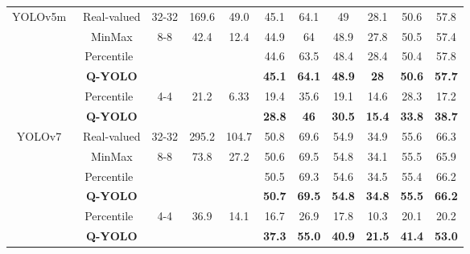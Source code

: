 \documentclass[runningheads]{llncs}
\begin{document}
\begin{table}[!t]
\begin{tabular}{ccccccccccc}
\multirow{6}{*}{YOLOv5m~\cite{yolov5}} & Real-valued & 32-32                & 169.6               & 49.0            & 45.1 & 64.1 & 49   & 28.1 & 50.6 & 57.8 \\ \cline{2-11} 
                         & MinMax      & \multirow{3}{*}{8-8} & \multirow{3}{*}{42.4} & \multirow{3}{*}{12.4}  & 44.9 & 64   & 48.9 & 27.8 & 50.5 & 57.4 \\
                         & Percentile~\cite{li2019fully}  & & &                      & 44.6 & 63.5 & 48.4 & 28.4 & 50.4 & 57.8 \\
                         & \textbf{Q-YOLO} & & & & \textbf{45.1} & \textbf{64.1} & \textbf{48.9} & \textbf{28} & \textbf{50.6} & \textbf{57.7} \\ \cline{2-11} 
                         & Percentile~\cite{li2019fully}  & \multirow{2}{*}{4-4} & \multirow{2}{*}{21.2} & \multirow{2}{*}{6.33}  & 19.4 & 35.6 & 19.1 & 14.6 & 28.3 & 17.2 \\
                         & \textbf{Q-YOLO} & & & & \textbf{28.8} & \textbf{46} & \textbf{30.5} & \textbf{15.4} & \textbf{33.8} & \textbf{38.7} \\ \hline
                         
\multirow{6}{*}{YOLOv7~\cite{wang2023yolov7}}  & Real-valued & 32-32                & 295.2               & 104.7           & 50.8 & 69.6 & 54.9 & 34.9 & 55.6 & 66.3 \\ \cline{2-11} 
                         & MinMax      & \multirow{3}{*}{8-8} & \multirow{3}{*}{73.8} & \multirow{3}{*}{27.2}  & 50.6 & 69.5 & 54.8 & 34.1 & 55.5 & 65.9 \\
                         & Percentile~\cite{li2019fully}  & & &                      & 50.5 & 69.3 & 54.6 & 34.5 & 55.4 & 66.2 \\
                         & \textbf{Q-YOLO}      & & &                      & \textbf{50.7} & \textbf{69.5} & \textbf{54.8} & \textbf{34.8}   & \textbf{55.5} & \textbf{66.2} \\ \cline{2-11} 
                         & Percentile~\cite{li2019fully}  & \multirow{2}{*}{4-4} & \multirow{2}{*}{36.9} & \multirow{2}{*}{14.1}  & 16.7    & 26.9 & 17.8  & 10.3  & 20.1 & 20.2  \\
                         & \textbf{Q-YOLO}      & & &                      & \textbf{37.3}   & \textbf{55.0} & \textbf{40.9} & \textbf{21.5}  & \textbf{41.4} & \textbf{53.0}   \\ \hline
                         

\end{tabular}
\end{table}
\end{document}

